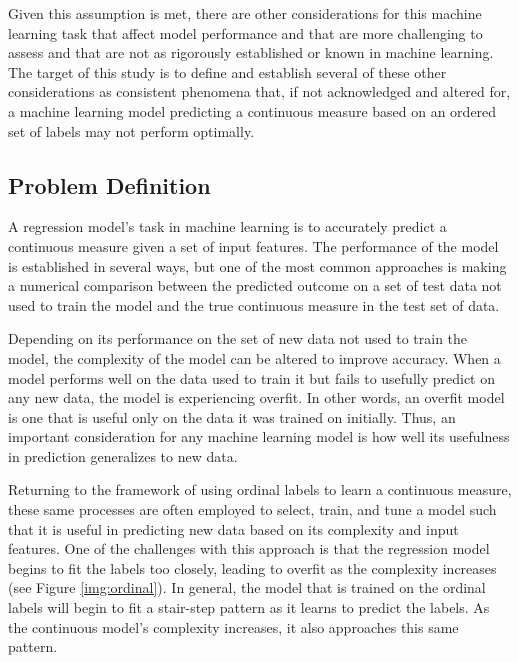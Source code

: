 \documentclass[10pt]{article}\usepackage[]{graphicx}\usepackage[]{xcolor}
\begin{document}
Given this assumption is met, there are other considerations for this machine learning task that affect model performance and that are more challenging to assess and that are not as rigorously established or known in machine learning. The target of this study is to define and establish several of these other considerations as consistent phenomena that, if not acknowledged and altered for, a machine learning model predicting a continuous measure based on an ordered set of labels may not perform optimally.


\subsection{Problem Definition}
A regression model's task in machine learning is to accurately predict a continuous measure given a set of input features. The performance of the model is established in several ways, but one of the most common approaches is making a numerical comparison between the predicted outcome on a set of test data not used to train the model and the true continuous measure in the test set of data. 

Depending on its performance on the set of new data not used to train the model, the complexity of the model can be altered to improve accuracy. When a model performs well on the data used to train it but fails to usefully predict on any new data, the model is experiencing overfit. In other words, an overfit model is one that is useful only on the data it was trained on initially. Thus, an important consideration for any machine learning model is how well its usefulness in prediction generalizes to new data.

Returning to the framework of using ordinal labels to learn a continuous measure, these same processes are often employed to select, train, and tune a model such that it is useful in predicting new data based on its complexity and input features. One of the challenges with this approach is that the regression model begins to fit the labels too closely, leading to overfit as the complexity increases (see Figure \ref{img:ordinal}). In general, the model that is trained on the ordinal labels will begin to fit a stair-step pattern as it learns to predict the labels. As the continuous model's complexity increases, it also approaches this same pattern. \\
\end{document}
